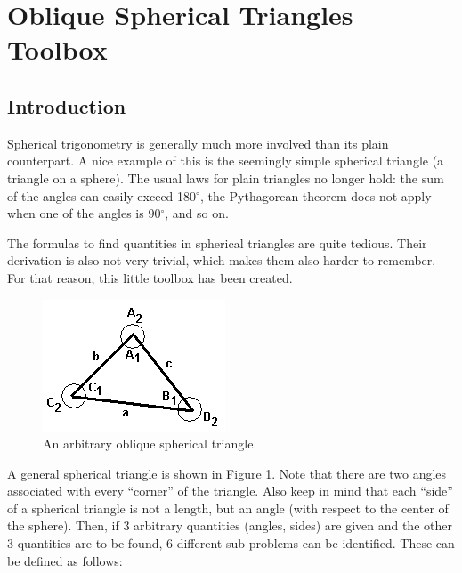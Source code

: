 \documentclass{report}
\begin{document}
\chapter*{Oblique Spherical Triangles Toolbox}
\section*{Introduction}

Spherical trigonometry is generally much more involved than its
plain counterpart. A nice example of this is the seemingly simple
spherical triangle (a triangle on a sphere). The usual laws for
plain triangles no longer hold: the sum of the angles can easily
exceed 180$^\circ$, the Pythagorean theorem does not apply when
one of the angles is 90$^\circ$, and so on.

The formulas to find quantities in spherical triangles are quite
tedious. Their derivation is also not very trivial, which makes
them also harder to remember. For that reason, this little toolbox
has been created.

\begin{figure}[h!]
         \centering
         \includegraphics[bb=0 0 205 148]{OblSphTri.png}
         \caption{An arbitrary oblique spherical triangle.}
         \label{fig}
\end{figure}

A general spherical triangle is shown in Figure \ref{fig}. Note
that there are two angles associated with every ``corner'' of the
triangle. Also keep in mind that each ``side'' of a spherical
triangle is not a length, but an angle (with respect to the center
of the sphere). Then, if 3 arbitrary quantities (angles, sides)
are given and the other 3 quantities are to be found, 6 different
sub-problems can be identified. These can be defined as
follows:
\end{document}
